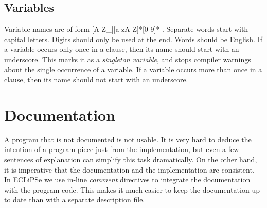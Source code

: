 \documentclass[a4paper,12pt]{report}
\begin{document}
\subsection{Variables}
Variable names are of form [A-Z\_][a-zA-Z]*[0-9]* . Separate words start with capital letters. Digits should only be used at the end. Words should be English. If a variable occurs only once in a clause, then its name should start with an underscore. This marks it as a {\it singleton variable}, and stops compiler warnings about the single occurrence of a variable. If a variable occurs more than once in a clause, then its name should not start with an underscore.

\section{Documentation}
A program that is not documented is not usable. It is very hard to deduce the intention of a program piece just from the implementation, but even a few sentences of explanation can simplify this task dramatically. On the other hand, it is imperative that the documentation and the implementation are consistent. In ECLiPSe we use in-line {\it comment} directives to integrate the documentation with the program code. This makes it much easier to keep the documentation up to date than with a separate description file.  
\end{document}
